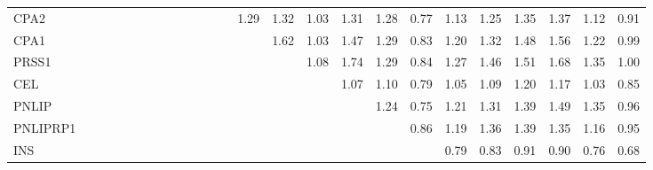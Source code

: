\begin{longtable}{lrrrrrrrrrrrrrrrrrrrrrrrr}
CPA2     &              &              &              &              &             &             &             &             &            &              &            &            &       1.29 &        1.32 &      1.03 &        1.31 &           1.28 &      0.77 &          1.13 &      1.25 &        1.35 &        1.37 &       1.12 &        0.91 \\
CPA1     &              &              &              &              &             &             &             &             &            &              &            &            &            &        1.62 &      1.03 &        1.47 &           1.29 &      0.83 &          1.20 &      1.32 &        1.48 &        1.56 &       1.22 &        0.99 \\
PRSS1    &              &              &              &              &             &             &             &             &            &              &            &            &            &             &      1.08 &        1.74 &           1.29 &      0.84 &          1.27 &      1.46 &        1.51 &        1.68 &       1.35 &        1.00 \\
CEL      &              &              &              &              &             &             &             &             &            &              &            &            &            &             &           &        1.07 &           1.10 &      0.79 &          1.05 &      1.09 &        1.20 &        1.17 &       1.03 &        0.85 \\
PNLIP    &              &              &              &              &             &             &             &             &            &              &            &            &            &             &           &             &           1.24 &      0.75 &          1.21 &      1.31 &        1.39 &        1.49 &       1.35 &        0.96 \\
PNLIPRP1 &              &              &              &              &             &             &             &             &            &              &            &            &            &             &           &             &                &      0.86 &          1.19 &      1.36 &        1.39 &        1.35 &       1.16 &        0.95 \\
INS      &              &              &              &              &             &             &             &             &            &              &            &            &            &             &           &             &                &           &          0.79 &      0.83 &        0.91 &        0.90 &       0.76 &        0.68 \\

\end{longtable}
